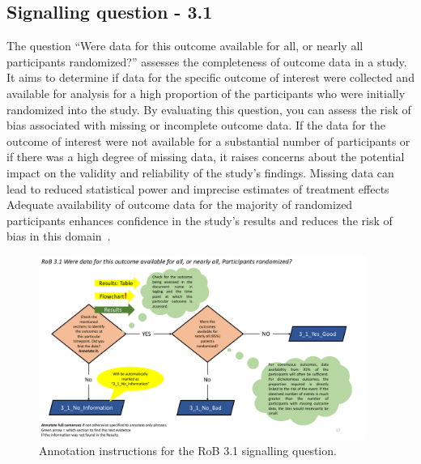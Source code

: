 \documentclass[sn-mathphys,Numbered]{sn-jnl}%
\begin{document}
\subsection*{Signalling question - 3.1 }
\label{subsec:3_1}
%
The question ``Were data for this outcome available for all, or nearly all participants randomized?'' assesses the completeness of outcome data in a study.
It aims to determine if data for the specific outcome of interest were collected and available for analysis for a high proportion of the participants who were initially randomized into the study.
By evaluating this question, you can assess the risk of bias associated with missing or incomplete outcome data.
If the data for the outcome of interest were not available for a substantial number of participants or if there was a high degree of missing data, it raises concerns about the potential impact on the validity and reliability of the study's findings.
Missing data can lead to reduced statistical power and imprecise estimates of treatment effects
Adequate availability of outcome data for the majority of randomized participants enhances confidence in the study's results and reduces the risk of bias in this domain~\cite{gnang2020empirical,shara2015randomly}.


%
%
%
\begin{figure}[hbt]
    \centering
    \includegraphics[width=0.95\textwidth]{figures/3_1.pdf}
    \caption{Annotation instructions for the RoB 3.1 signalling question.}
    \label{fig:3_1}
\end{figure}
%
%
%
\end{document}
